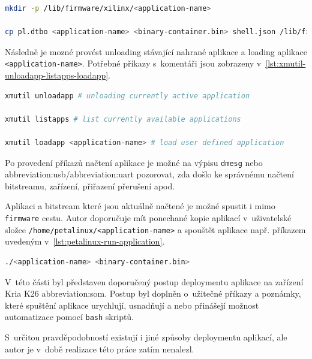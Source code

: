 \documentclass[a4paper, twoside, 11pt]{article}
\begin{document}
	\begin{lstlisting}[language={sh}, caption={Příkaz vytvoření potřebné složky aplikace a kopírování potřebných souborů firmwaru.}, label={lst:cp-application-to-firmware}, morekeywords={mkdir, cp}]
mkdir -p /lib/firmware/xilinx/<application-name>

cp pl.dtbo <application-name> <binary-container.bin> shell.json /lib/firmware/xilinx/<application-name>\end{lstlisting}
	
	Následně je mozné provést unloading stávající nahrané aplikace a loading aplikace \texttt{<application-name>}. Potřebné příkazy s~komentáři jsou zobrazeny v~\ref{lst:xmutil-unloadapp-listapps-loadapp}.\par

	\begin{lstlisting}[language={sh}, caption={Příkaz vytvoření potřebné složky aplikace a kopírování potřebných souborů firmwaru.}, label={lst:xmutil-unloadapp-listapps-loadapp}, morekeywords={xmutil}]
xmutil unloadapp # unloading currently active application

xmutil listapps # list currently available applications

xmutil loadapp <application-name> # load user defined application
\end{lstlisting}

Po provedení příkazů načtení aplikace je možné na výpisu \texttt{dmesg} nebo \gls{abbreviation:usb}/\gls{abbreviation:uart} pozorovat, zda došlo ke správnému načtení bitstreamu, zařízení, přiřazení přerušení apod.\par
Aplikaci a bitstream které jsou aktuálně načtené je možné spustit i mimo \texttt{firmware} cestu. Autor doporučuje mít ponechané kopie aplikací v~uživatelské složce \texttt{/home/petalinux/<application-name>} a spouštět aplikace např. příkazem uvedeným v~\ref{lst:petalinux-run-application}.\par


	\begin{lstlisting}[language={sh}, caption={Příkaz pro spuštění akcelerované aplikace.}, label={lst:petalinux-run-application}]
./<application-name> <binary-container.bin>\end{lstlisting}

	V~této části byl představen doporučený postup deploymentu aplikace na zařízení Kria K26 \gls{abbreviation:som}. Postup byl doplněn o~užitečné příkazy a poznámky, které spuštění aplikace urychlují, usnadňují a nebo přinášejí možnost automatizace pomocí \texttt{bash} skriptů.\par
	S~určitou pravděpodobností existují i jiné způsoby deploymentu aplikací, ale autor je v~době realizace této práce zatím nenalezl.
\end{document}
